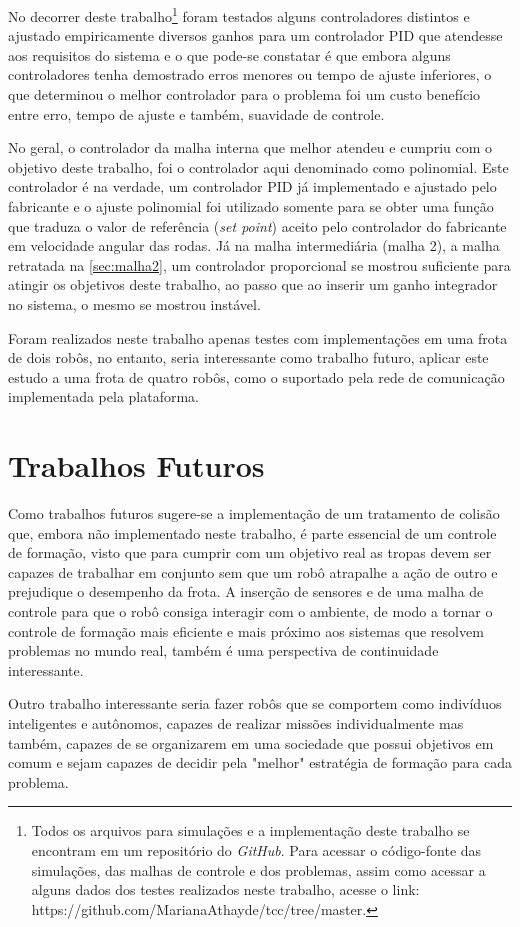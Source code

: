 No decorrer deste trabalho\footnote{Todos os arquivos para simulações e a implementação deste trabalho se encontram em um repositório do \emph{GitHub}. Para acessar o código-fonte das simulações, das malhas de controle e dos problemas, assim como acessar a alguns dados dos testes realizados neste trabalho, acesse o link: https://github.com/MarianaAthayde/tcc/tree/master.} foram testados alguns controladores distintos e ajustado empiricamente diversos ganhos para um controlador PID que atendesse aos requisitos do sistema e o que pode-se constatar é que embora alguns controladores tenha demostrado erros menores ou tempo de ajuste inferiores, o que determinou o melhor controlador para o problema foi um custo benefício entre erro, tempo de ajuste e também, suavidade de controle. 

No geral, o controlador da malha interna que melhor atendeu e cumpriu com o objetivo deste trabalho, foi o controlador aqui denominado como polinomial. %
Este controlador é na verdade, um controlador PID já implementado e ajustado pelo fabricante e o ajuste polinomial foi utilizado somente para se obter uma função que traduza o valor de referência (\emph{set point}) aceito pelo controlador do fabricante em velocidade angular das rodas. Já na malha intermediária (malha 2), a malha retratada na \autoref{sec:malha2}, um controlador proporcional se mostrou suficiente para atingir os objetivos deste trabalho, ao passo que ao inserir um ganho integrador no sistema, o mesmo se mostrou instável.

Foram realizados neste trabalho apenas testes com implementações em uma frota de dois robôs, no entanto, seria interessante como trabalho futuro, aplicar este estudo a uma frota de quatro robôs, como o suportado pela rede de comunicação implementada pela plataforma. 

\section{Trabalhos Futuros}
 \label{sec:trabFuturos}
 Como trabalhos futuros sugere-se a implementação de um tratamento de colisão que, embora não implementado neste trabalho, é parte essencial de um controle de formação, visto que para cumprir com um objetivo real as tropas devem ser capazes de trabalhar em conjunto sem que um robô atrapalhe a ação de outro e prejudique o desempenho da frota. A inserção de sensores e de uma malha de controle para que o robô consiga interagir com o ambiente, de modo a tornar o controle de formação mais eficiente e mais próximo aos sistemas que resolvem problemas no mundo real, também é uma perspectiva de continuidade interessante.
 
 Outro trabalho interessante seria fazer robôs que se comportem como indivíduos inteligentes e autônomos, capazes de realizar missões individualmente mas também, capazes de se organizarem em uma sociedade que possui objetivos em comum e sejam capazes de decidir pela "melhor" estratégia de formação para cada problema.
 
